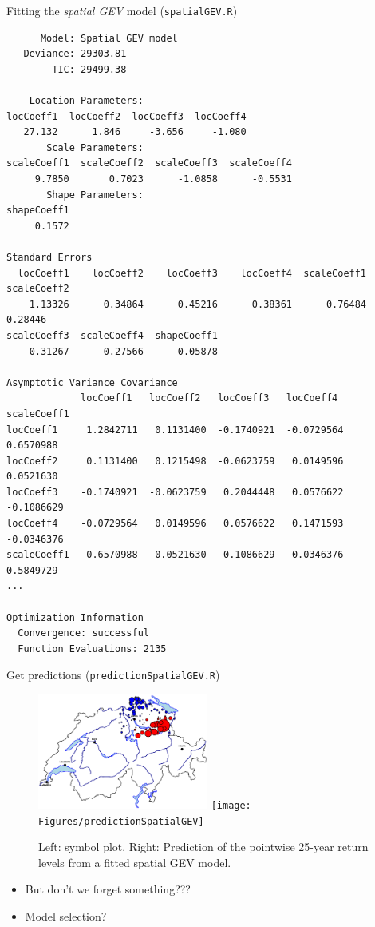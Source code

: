 \documentclass[blackslide,style=simple]{powerdot}
\theoremstyle{plain}%
\theoremstyle{definition}
\theoremstyle{remark}
\begin{document}
\begin{slide}[toc=,method=direct]{Fitting the \emph{spatial GEV} model
    (\texttt{spatialGEV.R})}
  \vspace*{-1em}
  \tiny{
\begin{verbatim}
      Model: Spatial GEV model
   Deviance: 29303.81 
        TIC: 29499.38 

    Location Parameters:
locCoeff1  locCoeff2  locCoeff3  locCoeff4  
   27.132      1.846     -3.656     -1.080  
       Scale Parameters:
scaleCoeff1  scaleCoeff2  scaleCoeff3  scaleCoeff4  
     9.7850       0.7023      -1.0858      -0.5531  
       Shape Parameters:
shapeCoeff1  
     0.1572  

Standard Errors
  locCoeff1    locCoeff2    locCoeff3    locCoeff4  scaleCoeff1  scaleCoeff2  
    1.13326      0.34864      0.45216      0.38361      0.76484      0.28446  
scaleCoeff3  scaleCoeff4  shapeCoeff1  
    0.31267      0.27566      0.05878

Asymptotic Variance Covariance
             locCoeff1   locCoeff2   locCoeff3   locCoeff4   scaleCoeff1
locCoeff1     1.2842711   0.1131400  -0.1740921  -0.0729564   0.6570988 
locCoeff2     0.1131400   0.1215498  -0.0623759   0.0149596   0.0521630 
locCoeff3    -0.1740921  -0.0623759   0.2044448   0.0576622  -0.1086629 
locCoeff4    -0.0729564   0.0149596   0.0576622   0.1471593  -0.0346376 
scaleCoeff1   0.6570988   0.0521630  -0.1086629  -0.0346376   0.5849729 
...

Optimization Information
  Convergence: successful 
  Function Evaluations: 2135 
\end{verbatim}
    }
\end{slide}

\begin{wideslide}[toc=Prediction \#1]{Get predictions (\texttt{predictionSpatialGEV.R})}
  \begin{figure}
    \centering
    \includegraphics[width=0.5\textwidth]{Figures/symbolPlot}%
    \texttt{[image: Figures/predictionSpatialGEV]}
    \caption{Left: symbol plot. Right: Prediction of the pointwise
      25-year return levels from a fitted spatial GEV model.}
    \label{fig:prediction}
  \end{figure}
  \pause
  \begin{itemize}
  \item But don't we forget something??? \pause
  \item Model selection?    
  \end{itemize}
\end{wideslide}
\end{document}
